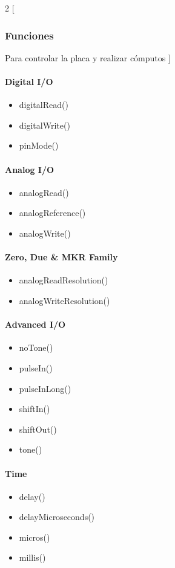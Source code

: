 \documentclass[../informe_krapp.tex]{subfiles}
\begin{document}
\begin{multicols}{2}
	[
		\subsubsection{Funciones}
		Para controlar la placa y realizar cómputos
	]
	\paragraph{Digital I/O}
	\begin{itemize}
		\item digitalRead()
		\item digitalWrite()
		\item pinMode()
	\end{itemize}

	\paragraph{Analog I/O}
	\begin{itemize}
		\item analogRead()
		\item analogReference()
		\item analogWrite()
	\end{itemize}

	\paragraph{Zero, Due \& MKR Family}
	\begin{itemize}
		\item analogReadResolution()
		\item analogWriteResolution()
	\end{itemize}

	\paragraph{Advanced I/O}
	\begin{itemize}
		\item noTone()
		\item pulseIn()
		\item pulseInLong()
		\item shiftIn()
		\item shiftOut()
		\item tone()
	\end{itemize}

	\paragraph{Time}
	\begin{itemize}
		\item delay()
		\item delayMicroseconds()
		\item micros()
		\item millis()
	\end{itemize}


\end{multicols}
\end{document}
